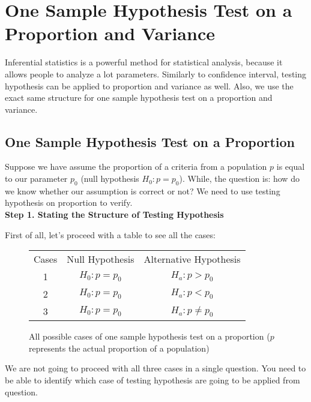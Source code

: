 \setcounter{chapter}{11}
\chapter{One Sample Hypothesis Test on a Proportion and Variance}

Inferential statistics is a powerful method for statistical analysis, because it allows people to analyze a lot parameters. Similarly to confidence interval, testing hypothesis can be applied to proportion and variance as well. Also, we use the exact same structure for one sample hypothesis test on a proportion and variance.

\section{One Sample Hypothesis Test on a Proportion}

Suppose we have assume the proportion of a criteria from a population $p$ is equal to our parameter $p_0$ (null hypothesis $H_0: p = p_0$). While, the question is: how do we know whether our assumption is correct or not? We need to use testing hypothesis on proportion to verify. \\

\textbf{Step 1. Stating the Structure of Testing Hypothesis}

First of all, let's proceed with a table to see all the cases:

\begin{center}
\begin{figure}[H]
\centering
\begin{tabular}{ c c c }
Cases & Null Hypothesis & Alternative Hypothesis \\
     1	   & $H_0: p = p_0$ & $H_a: p > p_0$ \\
     2	   & $H_0: p = p_0$ & $H_a: p < p_0$ \\
     3    & $H_0: p = p_0$ & $H_a: p \neq p_0$ \\
\end{tabular}
\caption{All possible cases of one sample hypothesis test on a proportion ($p$ represents the actual proportion of a population)}
\end{figure}
\end{center}
We are not going to proceed with all three cases in a single question. You need to be able to identify which case of testing hypothesis are going to be applied from question.\\

